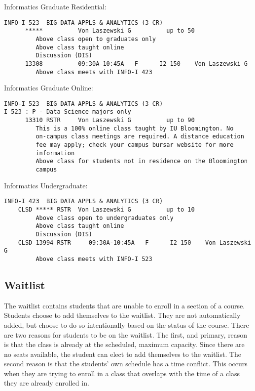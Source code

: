 Informatics Graduate Residential:

\begin{verbatim}
INFO-I 523  BIG DATA APPLS & ANALYTICS (3 CR)
      *****          Von Laszewski G          up to 50
         Above class open to graduates only
         Above class taught online
         Discussion (DIS)
      13308          09:30A-10:45A   F      I2 150    Von Laszewski G
         Above class meets with INFO-I 423
\end{verbatim}

Informatics Graduate Online:

\begin{verbatim}
INFO-I 523  BIG DATA APPLS & ANALYTICS (3 CR)
I 523 : P - Data Science majors only
      13310 RSTR     Von Laszewski G          up to 90
         This is a 100% online class taught by IU Bloomington. No
         on-campus class meetings are required. A distance education
         fee may apply; check your campus bursar website for more
         information
         Above class for students not in residence on the Bloomington
         campus
\end{verbatim}

Informatics Undergraduate:

\begin{verbatim}
INFO-I 423  BIG DATA APPLS & ANALYTICS (3 CR)
    CLSD ***** RSTR  Von Laszewski G          up to 10
         Above class open to undergraduates only
         Above class taught online
         Discussion (DIS)
    CLSD 13994 RSTR     09:30A-10:45A   F      I2 150    Von Laszewski G
         Above class meets with INFO-I 523
\end{verbatim}

\subsection{Waitlist}\label{waitlist}

The waitlist contains students that are unable to enroll in a section of
a course. Students choose to add themselves to the waitlist. They are
not automatically added, but choose to do so intentionally based on the
status of the course. There are two reasons for students to be on the
waitlist. The first, and primary, reason is that the class is already at
the scheduled, maximum capacity. Since there are no seats available, the
student can elect to add themselves to the waitlist. The second reason
is that the students' own schedule has a time conflict. This occurs when
they are trying to enroll in a class that overlaps with the time of a
class they are already enrolled in.

